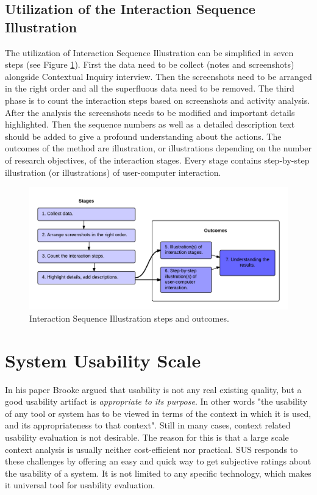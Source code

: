 \documentclass[12pt,a4paper,oneside,pdftex]{report}
\begin{document}
\subsection{Utilization of the Interaction Sequence Illustration}
The utilization of Interaction Sequence Illustration can be simplified in seven steps (see Figure \ref{fig:isi_chart}). First the data need to be collect (notes and screenshots) alongside Contextual Inquiry interview.
Then the screenshots need to be arranged in the right order and all the superfluous data need to be removed. The third phase is to count the interaction steps based on screenshots and activity analysis.
After the analysis the screenshots needs to be modified and important details highlighted. Then the sequence numbers as well as a  detailed description text should be added to give a profound understanding about the actions. The outcomes of the method are 			illustration, or illustrations depending on the number of research objectives, of the interaction stages. Every stage contains step-by-step illustration (or illustrations) of user-computer interaction. \cite{RefWorks:17}
	
\begin{figure}[H]
  	\centering
  	\includegraphics[width=1.1\textwidth]{./images/isi_chart.png}
  	\caption{Interaction Sequence Illustration steps and outcomes.}
	\label{fig:isi_chart}
\end{figure}

\section{System Usability Scale}
\label{sec:sus}
In his paper Brooke \cite{RefWorks:10} argued that usability is not any real existing quality, but a good usability artifact is \emph{appropriate to its purpose}. In other words "the usability of any tool or system has to be viewed in terms of the context in which it is 			used, and its appropriateness to that context"\cite{RefWorks:10}. Still in many cases, context related usability evaluation is not desirable. The reason for this is that a large scale context analysis is usually neither cost-efficient nor practical.\cite{RefWorks:10} 
SUS responds to these challenges by offering an easy and quick way to get subjective ratings about the usability of a system. It is not limited to any specific technology, which makes it universal tool for usability evaluation. \cite{RefWorks:12}
\end{document}
